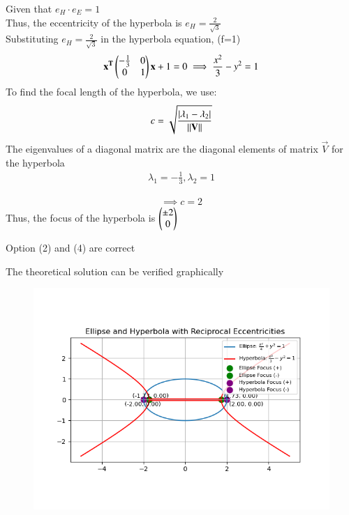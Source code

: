 \documentclass[journal]{IEEEtran}
\begin{document}
Given that $e_H\cdot e_E = 1$\\
Thus, the eccentricity of the hyperbola is $e_H = \frac{2}{\sqrt{3}}$\\

Substituting $e_H=\frac{2}{\sqrt{3}}$ in the hyperbola equation, (f=1) 
\begin{align}
\mathbf{x^T}\begin{pmatrix}-\frac{1}{3} & 0 \\ 0 & 1\end{pmatrix}\mathbf{x} + 1 = 0 \implies \frac{x^2}{3} - y^2 = 1
\end{align}
To find the focal length of the hyperbola, we use:
\begin{align}
c = \sqrt{\frac{\left\vert\lambda_1 - \lambda_2\right\vert}{\left\lVert\mathbf{V}\right\rVert}}
\end{align}
The eigenvalues of a diagonal matrix are the diagonal elements of matrix $\vec{V}$ for the hyperbola
\begin{align}
\lambda_1 = -\frac{1}{3} , \lambda_2 = 1
\end{align}

\begin{align}
\implies c = 2
\end{align}
Thus, the focus of the hyperbola is $\begin{pmatrix}\pm 2 \\ 0\end{pmatrix}$

Option (2) and (4) are correct

The theoretical solution can be verified graphically

\begin{figure}[H]
    \centering
    \includegraphics[height=0.5\textheight, keepaspectratio]{figs/Figure_1.png}
    \label{figure_1}
\end{figure}
\end{document}
